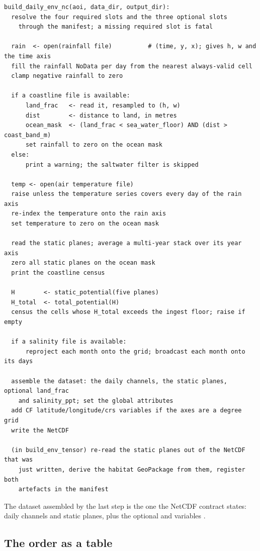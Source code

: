 \documentclass[11pt,a4paper]{article} \usepackage[utf8]{inputenc} \usepackage{lmodern} \usepackage[T1]{fontenc}
\begin{document}
\begin{verbatim}
build_daily_env_nc(aoi, data_dir, output_dir):
  resolve the four required slots and the three optional slots
    through the manifest; a missing required slot is fatal

  rain  <- open(rainfall file)          # (time, y, x); gives h, w and the time axis
  fill the rainfall NoData per day from the nearest always-valid cell
  clamp negative rainfall to zero

  if a coastline file is available:
      land_frac   <- read it, resampled to (h, w)
      dist        <- distance to land, in metres
      ocean_mask  <- (land_frac < sea_water_floor) AND (dist > coast_band_m)
      set rainfall to zero on the ocean mask
  else:
      print a warning; the saltwater filter is skipped

  temp <- open(air temperature file)
  raise unless the temperature series covers every day of the rain axis
  re-index the temperature onto the rain axis
  set temperature to zero on the ocean mask

  read the static planes; average a multi-year stack over its year axis
  zero all static planes on the ocean mask
  print the coastline census

  H        <- static_potential(five planes)
  H_total  <- total_potential(H)
  census the cells whose H_total exceeds the ingest floor; raise if empty

  if a salinity file is available:
      reproject each month onto the grid; broadcast each month onto its days

  assemble the dataset: the daily channels, the static planes, optional land_frac
    and salinity_ppt; set the global attributes
  add CF latitude/longitude/crs variables if the axes are a degree grid
  write the NetCDF

  (in build_env_tensor) re-read the static planes out of the NetCDF that was
    just written, derive the habitat GeoPackage from them, register both
    artefacts in the manifest
\end{verbatim}

\smallskip \noindent The dataset assembled by the last step is the one the NetCDF contract
states:  daily channels and
 static planes, plus the optional  and
 variables .

\subsection{The order as a table}
\end{document}
